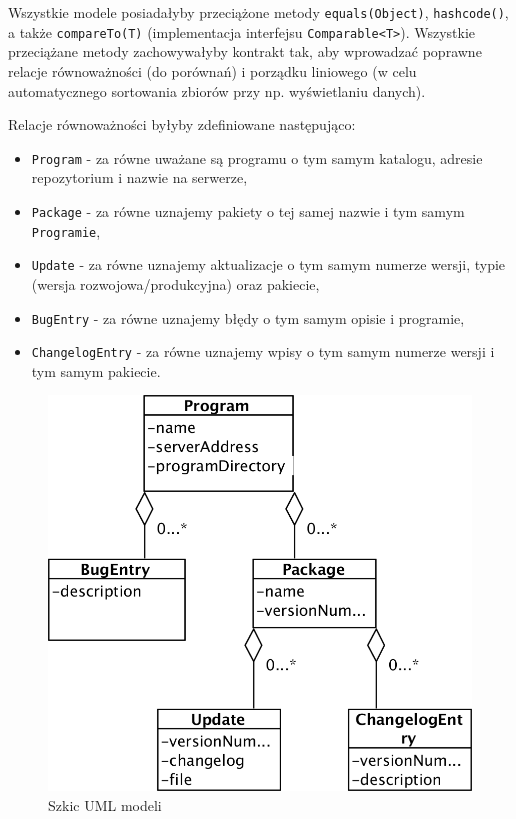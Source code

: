 \documentclass[polish,12pt,titlepage]{article}
\begin{document}
Wszystkie modele posiadałyby przeciążone metody \texttt{equals(Object)},
\texttt{hashcode()}, a także \texttt{compareTo(T)} (implementacja interfejsu
\texttt{Comparable<T>}). Wszystkie przeciążane metody zachowywałyby kontrakt
tak, aby wprowadzać poprawne relacje równoważności (do porównań) i porządku
liniowego (w celu automatycznego sortowania zbiorów przy np. wyświetlaniu
danych).

Relacje równoważności byłyby zdefiniowane następująco:
\begin{itemize}
  \item \texttt{Program} - za równe uważane są programu o tym samym katalogu,
    adresie repozytorium i nazwie na serwerze,
  \item \texttt{Package} - za równe uznajemy pakiety o tej samej nazwie i tym
    samym \texttt{Programie},
  \item \texttt{Update} - za równe uznajemy aktualizacje o tym samym numerze
    wersji, typie (wersja rozwojowa/produkcyjna) oraz pakiecie,
  \item \texttt{BugEntry} - za równe uznajemy błędy o tym samym opisie i
    programie,
  \item \texttt{ChangelogEntry} - za równe uznajemy wpisy o tym samym numerze 
    wersji i tym samym pakiecie.
\end{itemize}

\begin{figure}[!ht]
\centering
\includegraphics[bb=0 0 840 784, scale=0.35]{Models.png}
\caption{Szkic UML modeli}
\end{figure}
\end{document}
